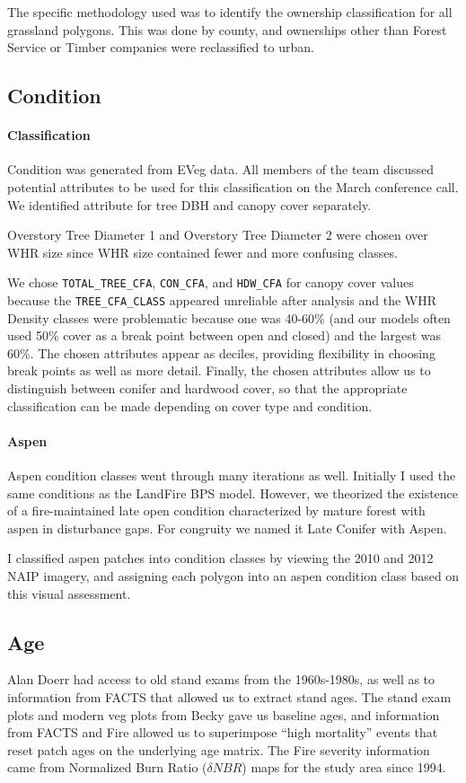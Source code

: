 The specific methodology used was to identify the ownership classification for all grassland polygons. This was done by county, and ownerships other than Forest Service or Timber companies were reclassified to urban.

\subsection{Condition}
\paragraph{Classification} Condition was generated from EVeg data. All members of the team discussed potential attributes to be used for this classification on the March conference call. We identified attribute for tree DBH and canopy cover separately.

Overstory Tree Diameter 1 and Overstory Tree Diameter 2 were chosen over WHR size since WHR size contained fewer and more confusing classes.

We chose \lstinline{TOTAL_TREE_CFA}, \lstinline{CON_CFA}, and \lstinline{HDW_CFA} for canopy cover values because the \lstinline{TREE_CFA_CLASS} appeared unreliable after analysis and the WHR Density classes were problematic because one was 40-60\% (and our models often used 50\% cover as a break point between open and closed) and the largest was 60\%. The chosen attributes appear as deciles, providing flexibility in choosing break points as well as more detail. Finally, the chosen attributes allow us to distinguish between conifer and hardwood cover, so that the appropriate classification can be made depending on cover type and condition.

\paragraph{Aspen} Aspen condition classes went through many iterations as well. Initially I used the same conditions as the LandFire BPS model. However, we theorized the existence of a fire-maintained late open condition characterized by mature forest with aspen in disturbance gaps. For congruity we named it Late Conifer with Aspen.

I classified aspen patches into condition classes by viewing the 2010 and 2012 NAIP imagery, and assigning each polygon into an aspen condition class based on this visual assessment.


\subsection{Age}
Alan Doerr had access to old stand exams from the 1960s-1980s, as well as to information from FACTS that allowed us to extract stand ages. The stand exam plots and modern veg plots from Becky gave us baseline ages, and information from FACTS and Fire allowed us to superimpose ``high mortality'' events that reset patch ages on the underlying age matrix. The Fire severity information came from Normalized Burn Ratio ($\delta NBR$) maps for the study area since 1994. 


